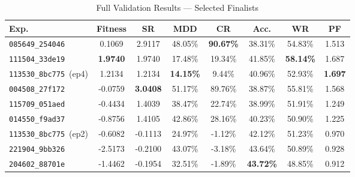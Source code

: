     \begin{table}[htbp]
    \centering
    \small
    \caption{Full Validation Results --- Selected Finalists}
    \label{tab:validation_results}
    \begin{tabular}{lccccccc}
    \hline
    \textbf{Exp.} & \textbf{Fitness} & \textbf{SR} & \textbf{MDD} & \textbf{CR} & \textbf{Acc.} & \textbf{WR} & \textbf{PF} \\
    \hline
    \texttt{085649\_254046} & 0.1069 & 2.9117 & 48.05\% & \textbf{90.67\%} & 38.31\% & 54.83\% & 1.513 \\
    \texttt{111504\_33de19} & \textbf{1.9740} & 1.9740 & 17.48\% & 19.34\% & 41.85\% & \textbf{58.14\%} & 1.687 \\
    \texttt{113530\_8bc775}~(ep4) & 1.2134 & 1.2134 & \textbf{14.15\%} & 9.44\% & 40.96\% & 52.93\% & \textbf{1.697} \\
    \texttt{004508\_27f172} & -0.0759 & \textbf{3.0408} & 51.17\% & 89.76\% & 38.87\% & 55.81\% & 1.568 \\
    \texttt{115709\_051aed} & -0.4434 & 1.4039 & 38.47\% & 22.74\% & 38.99\% & 51.91\% & 1.249 \\
    \texttt{014550\_f9ad37} & -0.8756 & 1.4105 & 42.86\% & 28.16\% & 40.23\% & 50.90\% & 1.225 \\
    \texttt{113530\_8bc775}~(ep2) & -0.6082 & -0.1113 & 24.97\% & -1.12\% & 42.12\% & 51.23\% & 0.970 \\
    \texttt{221904\_9bb326} & -2.5173 & -0.2100 & 43.07\% & -3.18\% & 43.64\% & 50.89\% & 0.928 \\
    \texttt{204602\_88701e} & -1.4462 & -0.1954 & 32.51\% & -1.89\% & \textbf{43.72\%} & 48.85\% & 0.912 \\
    \hline
    \end{tabular}
    \end{table}

